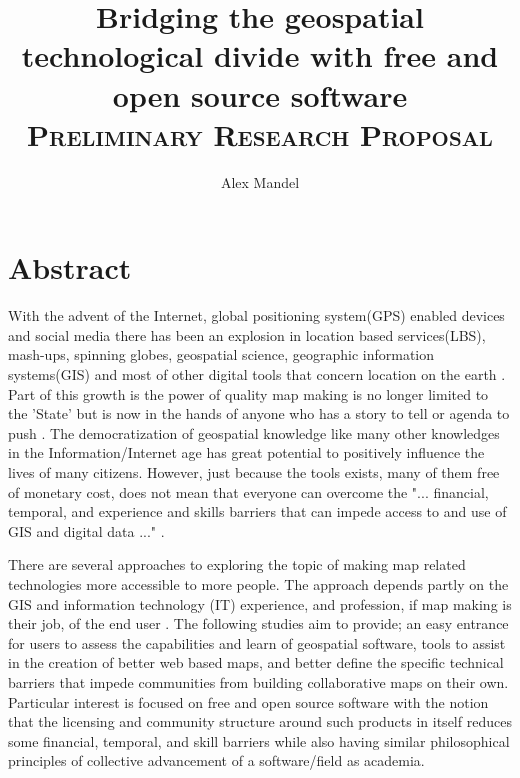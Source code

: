 \documentclass[12pt,letterpaper]{article}
\author{Alex Mandel}
\title{Bridging the geospatial technological divide with free and open source software
\\	
\textsc{\small Preliminary Research Proposal}\\[0.5cm]
}
\begin{document}
\maketitle
\tableofcontents
\onehalfspace
\section{Abstract}

	With the advent of the Internet, global positioning system(GPS) enabled devices and social media there has been an explosion in location based services(LBS), mash-ups, spinning globes, geospatial science, geographic information systems(GIS) and most of other digital tools that concern location on the earth \parencite{Tate2009}. Part of this growth is the power of quality map making is no longer limited to the 'State' but is now in the hands of anyone who has a story to tell or agenda to push \parencite{Wood2010}. The democratization of geospatial knowledge like many other knowledges in the Information/Internet age has great potential to positively influence the lives of many citizens. However, just because the tools exists, many of them free of monetary cost, does not mean that everyone can overcome the "... financial, temporal, and experience and skills barriers that can impede access to and use of GIS and digital data ..." \parencite{Elwood2006}. 


	There are several approaches to exploring the topic of making map related technologies more accessible to more people. The approach depends partly on the GIS and information technology (IT) experience, and profession, if map making is their job, of the end user \parencite{Donnelly2010}. The following studies aim to provide; an easy entrance for users to assess the capabilities and learn of geospatial software, tools to assist in the creation of better web based maps, and better define the specific technical barriers that impede communities from building collaborative maps on their own. Particular interest is focused on free and open source software\parencite{Lindberg2008} with the notion that the licensing and community structure around such products in itself reduces some financial, temporal, and skill barriers while also having similar philosophical principles of collective advancement of a software/field as academia. 
\end{document}
